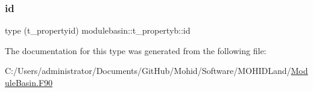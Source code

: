 \mbox{\label{structmodulebasin_1_1t__propertyb_a25a924d518be1886ca93cef044db2ab7}} 
\subsubsection{\texorpdfstring{id}{id}}
{\footnotesize\ttfamily type (t\+\_\+propertyid) modulebasin\+::t\+\_\+propertyb\+::id\hspace{0.3cm}{\ttfamily [private]}}



The documentation for this type was generated from the following file\+:\begin{DoxyCompactItemize}
\item 
C\+:/\+Users/administrator/\+Documents/\+Git\+Hub/\+Mohid/\+Software/\+M\+O\+H\+I\+D\+Land/\mbox{\hyperlink{_module_basin_8_f90}{Module\+Basin.\+F90}}\end{DoxyCompactItemize}
